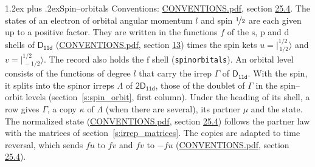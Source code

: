 \documentclass[10pt,a4paper]{article}
\makeatletter
\renewcommand\section{\@startsection{section}{1}{\z@}{-3ex plus -1ex minus -.2ex}%
  {1.2ex plus .2ex}{\normalfont\large\sffamily\bfseries\color{parttitle}}}
\numberwithin{equation}{section}
\newcommand{\grp}[1]{\mathsf{#1}}
\newcommand{\orbital}[1]{\mathrm{#1}}
\newcommand{\mult}{\kappa}
\newcommand{\intx}{\mu}
\newcommand{\jm}[2]{\bigl\lvert{}^{#1}_{\,#2}\bigr\rangle}
\makeatother
\begin{document}
\section{Spin--orbitals}\label{s:spin_orbitals}
Conventions: \href{../../CONVENTIONS.pdf}{CONVENTIONS.pdf}, section \href{../../CONVENTIONS.pdf\#conv.25.4}{25.4}.
\leavevmode\label{n:index.orbital.l}The states of an electron of orbital angular momentum $l$ and spin $\nicefrac{1}{2}$ are each given up to a positive factor. \label{n:local.spinor.uv}\label{n:local.function.f}They are written in the functions $f$ of the $\orbital{s}$, $\orbital{p}$ and $\orbital{d}$ shells of \href{../../../rotation/data/pdf/D11d.pdf}{$\grp{D_{11d}}$} (\href{../../CONVENTIONS.pdf}{CONVENTIONS.pdf}, section \href{../../../rotation/CONVENTIONS.pdf\#conv.13}{13}) times the spin kets $u = \jm{1/2}{1/2}$ and $v = \jm{1/2}{-1/2}$. The record also holds the $\orbital{f}$ shell (\texttt{spinorbitals}). An orbital level consists of the functions of degree $l$ that carry the irrep $\Gamma$ of \href{../../../rotation/data/pdf/D11d.pdf}{$\grp{D_{11d}}$}. With the spin, it splits into the spinor irreps $\Lambda$ of $\grp{2D_{11d}}$, those of the doublet of $\Gamma$ in the spin--orbit levels (section~\ref{s:spin_orbit}, first column). \label{n:head.state}Under the heading of its shell, a row gives $\Gamma$, a copy $\mult$ of $\Lambda$ (when there are several), its partner $\intx$ and the state. The normalized state (\href{../../CONVENTIONS.pdf}{CONVENTIONS.pdf}, section \href{../../CONVENTIONS.pdf\#conv.25.4}{25.4}) follows the partner law with the matrices of section~\ref{s:irrep_matrices}. The copies are adapted to time reversal, which sends $f u$ to $f v$ and $f v$ to $-f u$ (\href{../../CONVENTIONS.pdf}{CONVENTIONS.pdf}, section \href{../../CONVENTIONS.pdf\#conv.25.4}{25.4}).
\end{document}
